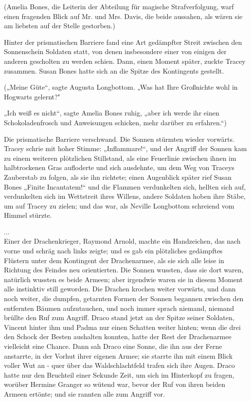 {(Amelia Bones, die Leiterin der Abteilung für magische Strafverfolgung, warf einen fragenden Blick auf Mr. und Mrs. Davis, die beide aussahen, als wären sie am liebsten auf der Stelle gestorben.)

Hinter der prismatischen Barriere fand eine Art gedämpfter Streit zwischen den Sonnenschein Soldaten statt, von denen insbesondere einer von einigen der anderen gescholten zu werden schien. Dann, einen Moment später, zuckte Tracey zusammen. Susan Bones hatte sich an die Spitze des Kontingents gestellt.

(„Meine Güte“, sagte Augusta Longbottom. „Was hat Ihre Großnichte wohl in Hogwarts gelernt?"

„Ich weiß es nicht“, sagte Amelia Bones ruhig, „aber ich werde ihr einen Schokoladenfrosch und Anweisungen schicken, mehr darüber zu erfahren.“)

Die prismatische Barriere verschwand. Die Sonnen stürmten wieder vorwärts. Tracey schrie mit hoher Stimme: „Inflammare!“, und der Angriff der Sonnen kam zu einem weiteren plötzlichen Stillstand, als eine Feuerlinie zwischen ihnen im halbtrockenen Gras aufloderte und sich ausdehnte, um dem Weg von Traceys Zauberstab zu folgen, als sie ihn richtete; einen Augenblick später rief Susan Bones „Finite Incantatem!“ und die Flammen verdunkelten sich, hellten sich auf, verdunkelten sich im Wettstreit ihres Willens, andere Soldaten hoben ihre Stäbe, um auf Tracey zu zielen; und das war, als Neville Longbottom schreiend vom Himmel stürzte.

...\\ Einer der Drachenkrieger, Raymond Arnold, machte ein Handzeichen, das nach vorne und schräg nach links zeigte; und es gab ein plötzliches gedämpftes Flüstern unter dem Kontingent der Drachenarmee, als sie sich alle leise in Richtung des Feindes neu orientierten. Die Sonnen wussten, dass sie dort waren, natürlich wussten es beide Armeen; aber irgendwie waren sie in diesem Moment alle instinktiv still geworden. Die Drachen krochen weiter vorwärts, und dann noch weiter, die dumpfen, getarnten Formen der Sonnen begannen zwischen den entfernten Bäumen aufzutauchen, und noch immer sprach niemand, niemand brüllte den Ruf zum Angriff. Draco stand jetzt an der Spitze seiner Soldaten, Vincent hinter ihm und Padma nur einen Schatten weiter hinten; wenn die drei den Schock der Besten aushalten konnten, hatte der Rest der Drachenarmee vielleicht eine Chance. Dann sah Draco eine Sonne, die ihn aus der Ferne anstarrte, in der Vorhut ihrer eigenen Armee; sie starrte ihn mit einem Blick voller Wut an - quer über das Waldschlachtfeld trafen sich ihre Augen. Draco hatte nur den Bruchteil einer Sekunde Zeit, um sich im Hinterkopf zu fragen, worüber Hermine Granger so wütend war, bevor der Ruf von ihren beiden Armeen ertönte; und sie rannten alle zum Angriff vor.

}
